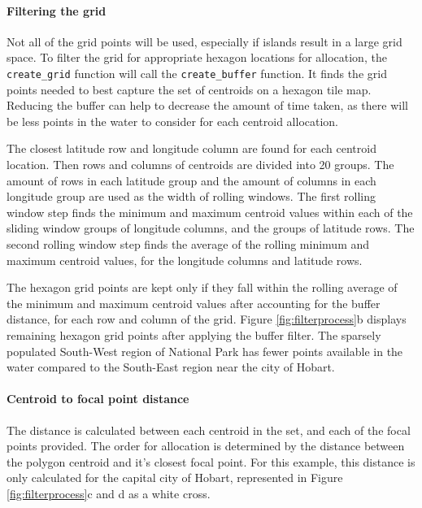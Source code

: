 \hypertarget{filtering-the-grid}{%
\paragraph{Filtering the grid}\label{filtering-the-grid}}

Not all of the grid points will be used, especially if islands result in
a large grid space. To filter the grid for appropriate hexagon locations
for allocation, the \texttt{create\_grid} function will call the
\texttt{create\_buffer} function. It finds the grid points needed to
best capture the set of centroids on a hexagon tile map. Reducing the
buffer can help to decrease the amount of time taken, as there will be
less points in the water to consider for each centroid allocation.

The closest latitude row and longitude column are found for each
centroid location. Then rows and columns of centroids are divided into
20 groups. The amount of rows in each latitude group and the amount of
columns in each longitude group are used as the width of rolling
windows. The first rolling window step finds the minimum and maximum
centroid values within each of the sliding window groups of longitude
columns, and the groups of latitude rows. The second rolling window step
finds the average of the rolling minimum and maximum centroid values,
for the longitude columns and latitude rows.

The hexagon grid points are kept only if they fall within the rolling
average of the minimum and maximum centroid values after accounting for
the buffer distance, for each row and column of the grid. Figure
\ref{fig:filterprocess}b displays remaining hexagon grid points after
applying the buffer filter. The sparsely populated South-West region of
National Park has fewer points available in the water compared to the
South-East region near the city of Hobart.

\hypertarget{centroid-to-focal-point-distance}{%
\paragraph{Centroid to focal point
distance}\label{centroid-to-focal-point-distance}}

The distance is calculated between each centroid in the set, and each of
the focal points provided. The order for allocation is determined by the
distance between the polygon centroid and it's closest focal point. For
this example, this distance is only calculated for the capital city of
Hobart, represented in Figure \ref{fig:filterprocess}c and d as a white
cross.

